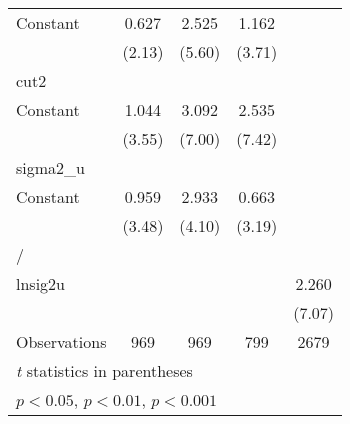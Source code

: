 {\begin{longtable}{l*{4}{c}}
Constant        &    0.627\sym{*}  &    2.525\sym{***}&    1.162\sym{***}&                  \\
                &   (2.13)         &   (5.60)         &   (3.71)         &                  \\
\hline
cut2            &                  &                  &                  &                  \\
Constant        &    1.044\sym{***}&    3.092\sym{***}&    2.535\sym{***}&                  \\
                &   (3.55)         &   (7.00)         &   (7.42)         &                  \\
\hline
sigma2\_u        &                  &                  &                  &                  \\
Constant        &    0.959\sym{***}&    2.933\sym{***}&    0.663\sym{**} &                  \\
                &   (3.48)         &   (4.10)         &   (3.19)         &                  \\
\hline
/               &                  &                  &                  &                  \\
lnsig2u         &                  &                  &                  &    2.260\sym{***}\\
                &                  &                  &                  &   (7.07)         \\
\hline
Observations    &      969         &      969         &      799         &     2679         \\
\hline\hline
\multicolumn{5}{l}{\footnotesize \textit{t} statistics in parentheses}\\
\multicolumn{5}{l}{\footnotesize \sym{*} \(p<0.05\), \sym{**} \(p<0.01\), \sym{***} \(p<0.001\)}\\
\end{longtable}
}
